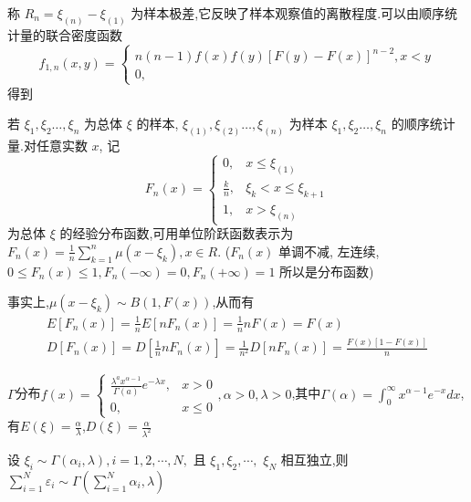 \documentclass[10pt]{yerbaformat}
\begin{document}
\begin{definition}[极差]
    称 $R_{n}=\xi_{(n)}-\xi_{(1)}$ 为样本极差,它反映了样本观察值的离散程度.可以由顺序统计量的联合密度函数$$f_{1, n}(x, y)=\left\{\begin{array}{c}n(n-1) f(x) f(y)[F(y)-F(x)]^{n-2}, x<y \\ 0,\end{array}\right.$$得到
\end{definition}

\begin{definition}[经验分布函数]
    若 $\xi_{1}, \xi_{2} \ldots, \xi_{n}$ 为总体 $\xi$ 的样本, $\xi_{(1)}, \xi_{(2)} \ldots, \xi_{(n)}$ 为样本 $\xi_{1}, \xi_{2} \ldots, \xi_{n}$ 的顺序统计量.对任意实数 $x$, 记 $$F_{n}(x)=\left\{\begin{array}{cc}0, & x \leq \xi_{(1)} \\ \frac{k}{n}, & \xi_{k}<x \leq \xi_{k+1} \\ 1, & x>\xi_{(n)}\end{array}\right.$$为总体 $\xi$ 的经验分布函数,可用单位阶跃函数表示为 $F_{n}(x)=\frac{1}{n} \sum_{k=1}^{n} \mu\left(x-\xi_{k}\right), x \in R$. ($F_{n}(x)$ 单调不减, 左连续, $0 \leq F_{n}(x) \leq 1, F_{n}(-\infty)=0, F_{n}(+\infty)=1$ 所以是分布函数)
\end{definition}

\par 事实上,$\mu\left(x-\xi_{k}\right) \sim B(1, F(x))$,从而有$$\begin{array}{c}
        E\left[F_{n}(x)\right]=\frac{1}{n} E\left[n F_{n}(x)\right]=\frac{1}{n} n F(x)=F(x) \\
        D\left[F_{n}(x)\right]=D\left[\frac{1}{n} n F_{n}(x)\right]=\frac{1}{n^{2}} D\left[n F_{n}(x)\right]=\frac{F(x)[1-F(x)]}{n}
    \end{array}$$

\par $ \Gamma $分布$f(x)=\left\{\begin{array}{cl}\frac{\lambda^{a} x^{\alpha-1}}{\Gamma(a)} e^{-\lambda x}, & x>0 \\ 0, & x \leqslant 0\end{array}, \alpha>0, \lambda>0\right.$,其中$\Gamma(\alpha)=\int_{0}^{\infty} x^{\alpha-1} e^{-x} d x$,有$E(\xi)=\frac{\alpha}{\lambda}$,$D(\xi)=\frac{\alpha}{{\lambda}^{2}}$
\begin{theorem}
    设 $\xi_{i} \sim \Gamma\left(\alpha_{i}, \lambda\right), i=1,2, \cdots, N,$ 且 $\xi_{1}, \xi_{2}, \cdots,$
    $\xi_{N}$ 相互独立,则 $\sum_{i=1}^{N} \varepsilon_{i} \sim \Gamma\left(\sum_{i=1}^{N} \alpha_{i}, \lambda\right)$
\end{theorem}
\end{document}
